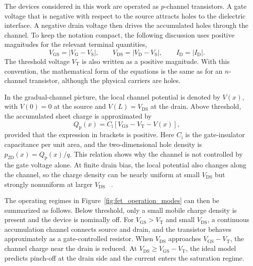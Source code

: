 The devices considered in this work are operated as $p$-channel transistors. A
gate voltage that is negative with respect to the source attracts holes to the
dielectric interface. A negative drain voltage then drives the accumulated holes
through the channel. To keep the notation compact, the following discussion uses
positive magnitudes for the relevant terminal quantities,
\begin{equation}
    V_\mathrm{GS}=\left|V_\mathrm{G}-V_\mathrm{S}\right|,
    \qquad
    V_\mathrm{DS}=\left|V_\mathrm{D}-V_\mathrm{S}\right|,
    \qquad
    I_\mathrm{D}=\left|I_\mathrm{D}\right|.
    \label{eq:pfet_magnitude_convention}
\end{equation}
The threshold voltage $V_\mathrm{T}$ is also written as a positive magnitude.
With this convention, the mathematical form of the equations is the same as for
an $n$-channel transistor, although the physical carriers are holes.

In the gradual-channel picture, the local channel potential is denoted by
$V(x)$, with $V(0)=0$ at the source and $V(L)=V_\mathrm{DS}$ at the drain. Above
threshold, the accumulated sheet charge is approximated by
\begin{equation}
    Q_\mathrm{p}(x)
    = C_\mathrm{i}\left[V_\mathrm{GS}-V_\mathrm{T}-V(x)\right],
    \label{eq:fet_local_sheet_charge}
\end{equation}
provided that the expression in brackets is positive. Here $C_\mathrm{i}$ is the
gate-insulator capacitance per unit area, and the two-dimensional hole density is
$p_\mathrm{2D}(x)=Q_\mathrm{p}(x)/q$. This relation shows why the channel is not
controlled by the gate voltage alone. At finite drain bias, the local potential
also changes along the channel, so the charge density can be nearly uniform at
small $V_\mathrm{DS}$ but strongly nonuniform at larger $V_\mathrm{DS}$
~\cite{Hu2010ModernSemiconductorDevices,Marinov2009OTFTPartI}.

The operating regimes in Figure~\ref{fig:fet_operation_modes} can then be
summarized as follows. Below threshold, only a small mobile charge density is
present and the device is nominally off. For $V_\mathrm{GS}>V_\mathrm{T}$ and
small $V_\mathrm{DS}$, a continuous accumulation channel connects source and
drain, and the transistor behaves approximately as a gate-controlled resistor.
When $V_\mathrm{DS}$ approaches $V_\mathrm{GS} - V_\mathrm{T}$, the channel charge near the drain
is reduced. At $V_\mathrm{DS}\geq V_\mathrm{GS} - V_\mathrm{T}$, the ideal model predicts
pinch-off at the drain side and the current enters the saturation regime.

